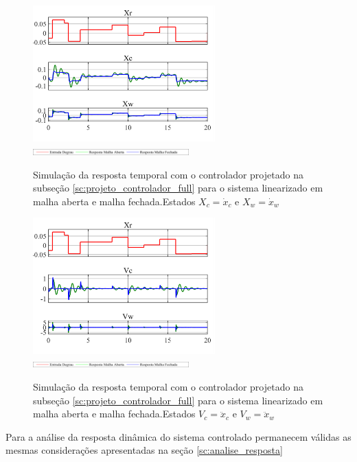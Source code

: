 \documentclass[a4paper]{ifacconf}
\begin{document}
    \FloatBarrier
    \begin{figure}[htbp]
        \begin{centering}
            \includegraphics[width=7cm]{img/simulaca_temporal_linear_perturbacao.png}
            \includegraphics[width=6cm]{img/sim_linear_simulink_temp_leg.png}
            \caption{Simulação da resposta temporal com o controlador projetado na subseção \ref{sc:projeto_controlador_full} para o sistema linearizado em malha aberta e malha fechada.Estados $X_c = \dot{x}_c$ e $X_w = \dot{x}_w$ }
            \label{fig:simulaca_temporal_linear_perturbacao}
        \end{centering}
    \end{figure}
    \FloatBarrier
    \FloatBarrier
    \begin{figure}[htbp]
        \begin{centering}
            \includegraphics[width=7cm]{img/simulaca_temporal_linear_perturbacao_V.png}
            \includegraphics[width=6cm]{img/sim_linear_simulink_temp_leg.png}
            \caption{Simulação da resposta temporal com o controlador projetado na subseção \ref{sc:projeto_controlador_full} para o sistema linearizado em malha aberta e malha fechada.Estados $V_c = \ddot{x}_c$ e $V_w = \ddot{x}_w$ }
            \label{fig:simulaca_temporal_linear_perturbacao_V}
        \end{centering}
    \end{figure}
    \FloatBarrier
    Para a análise da resposta dinâmica do sistema controlado permanecem válidas as mesmas considerações apresentadas na seção \ref{sc:analise_resposta}
\end{document}

